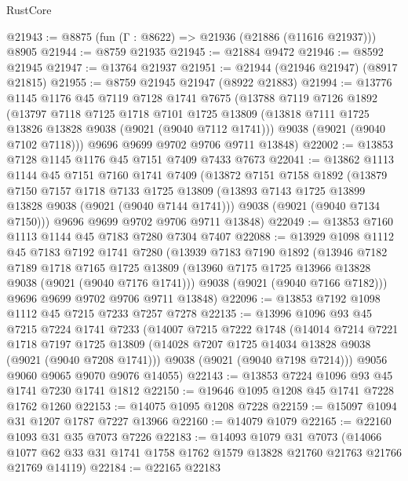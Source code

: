 \begin{lexlean}{RustCore}
\begin{coremodule}
@21943 := @8875 (fun (Γ : @8622) => @21936 (@21886 (@11616 @21937))) @8905
@21944 := @8759 @21935
@21945 := @21884 @9472
@21946 := @8592 @21945
@21947 := @13764 @21937
@21951 := @21944 (@21946 @21947) (@8917 @21815)
@21955 := @8759 @21945 @21947 (@8922 @21883)
@21994 := @13776
    @1145
    @1176
    @45
    @7119
    @7128
    @1741
    @7675
    (@13788
      @7119
      @7126
      @1892
      (@13797
        @7118
        @7125
        @1718
        @7101
        @1725
        @13809
        (@13818 @7111 @1725 @13826 @13828 @9038 (@9021 (@9040 @7112 @1741)))
        @9038
        (@9021 (@9040 @7102 @7118)))
      @9696
      @9699
      @9702
      @9706
      @9711
      @13848)
@22002 := @13853 @7128 @1145 @1176 @45 @7151 @7409 @7433 @7673
@22041 := @13862
    @1113
    @1144
    @45
    @7151
    @7160
    @1741
    @7409
    (@13872
      @7151
      @7158
      @1892
      (@13879
        @7150
        @7157
        @1718
        @7133
        @1725
        @13809
        (@13893 @7143 @1725 @13899 @13828 @9038 (@9021 (@9040 @7144 @1741)))
        @9038
        (@9021 (@9040 @7134 @7150)))
      @9696
      @9699
      @9702
      @9706
      @9711
      @13848)
@22049 := @13853 @7160 @1113 @1144 @45 @7183 @7280 @7304 @7407
@22088 := @13929
    @1098
    @1112
    @45
    @7183
    @7192
    @1741
    @7280
    (@13939
      @7183
      @7190
      @1892
      (@13946
        @7182
        @7189
        @1718
        @7165
        @1725
        @13809
        (@13960 @7175 @1725 @13966 @13828 @9038 (@9021 (@9040 @7176 @1741)))
        @9038
        (@9021 (@9040 @7166 @7182)))
      @9696
      @9699
      @9702
      @9706
      @9711
      @13848)
@22096 := @13853 @7192 @1098 @1112 @45 @7215 @7233 @7257 @7278
@22135 := @13996
    @1096
    @93
    @45
    @7215
    @7224
    @1741
    @7233
    (@14007
      @7215
      @7222
      @1748
      (@14014
        @7214
        @7221
        @1718
        @7197
        @1725
        @13809
        (@14028 @7207 @1725 @14034 @13828 @9038 (@9021 (@9040 @7208 @1741)))
        @9038
        (@9021 (@9040 @7198 @7214)))
      @9056
      @9060
      @9065
      @9070
      @9076
      @14055)
@22143 := @13853 @7224 @1096 @93 @45 @1741 @7230 @1741 @1812
@22150 := @19646 @1095 @1208 @45 @1741 @7228 @1762 @1260
@22153 := @14075 @1095 @1208 @7228
@22159 := @15097 @1094 @31 @1207 @1787 @7227 @13966
@22160 := @14079 @1079
@22165 := @22160 @1093 @31 @35 @7073 @7226
@22183 := @14093
    @1079
    @31
    @7073
    (@14066 @1077 @62 @33 @31 @1741 @1758 @1762 @1579 @13828 @21760 @21763 @21766 @21769 @14119)
@22184 := @22165 @22183

\end{coremodule}
\end{lexlean}
